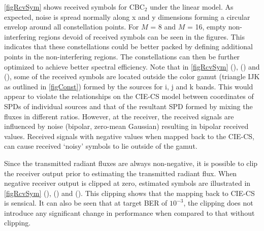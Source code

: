 \documentclass[10pt,letterpaper]{article}
\begin{document}
\figurename{ }\ref{figRcvSym} shows received symbols for CBC$_{2}$ under the linear model. As expected, noise is spread normally along x and y dimensions forming a circular envelop around all constellation points. For $M$ = 8 and $M$ = 16, empty non-interfering regions devoid of received symbols can be seen in the figures. This indicates that these constellations could be better packed by defining additional points in the non-interfering regions. The constellations can then be further optimized to achieve better spectral efficiency. Note that in \figurename{ }\ref{figRcvSym} (),
() and (), some of the received
symbols are located outside the color gamut (triangle IJK
as outlined in \figurename{ }\ref{figConst}) formed by the sources for
i, j and k bands. This would appear to violate the relationships on the CIE-CS model between coordinates of SPDs of individual sources and that of the resultant SPD formed by mixing the fluxes in different ratios. However, at the receiver, the
received signals are influenced by noise (bipolar, zero-mean Gaussian)
resulting in bipolar received values. Received signals with negative values when mapped back to the CIE-CS, can cause received `noisy' symbols to lie outside of the gamut.

Since the transmitted radiant fluxes are always non-negative, it is possible to clip the receiver output prior to estimating the transmitted
radiant flux.  When negative receiver output is clipped at zero, estimated
symbols are illustrated in
\figurename{ }\ref{figRcvSym} (),
() and (). This
clipping shows that the mapping back to CIE-CS is sensical. It can also be seen that at target BER of $10^{-3}$, the clipping does not
introduce any significant change in performance when compared to that without clipping.
\end{document}

